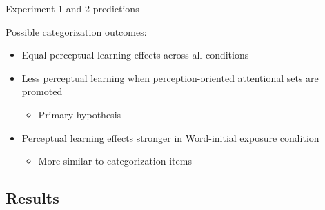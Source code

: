 \documentclass{beamer}
\begin{document}
\begin{frame}{Experiment 1 and 2 predictions}

Possible categorization outcomes:
\begin{itemize}
\item Equal perceptual learning effects across all conditions
\item Less perceptual learning when perception-oriented attentional sets are promoted
\begin{itemize}
\item Primary hypothesis
\end{itemize}
\item Perceptual learning effects stronger in Word-initial exposure condition
\begin{itemize}
\item More similar to categorization items
\end{itemize}
\end{itemize}
\end{frame}

\subsection{Results}
\end{document}
